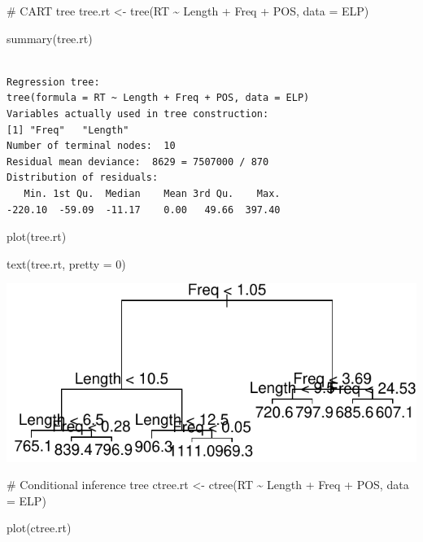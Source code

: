 \documentclass[
  11pt,
  letterpaper,
  DIV=11,
  numbers=noendperiod]{scrreprt}
\newenvironment{Shaded}{\begin{snugshade}}{\end{snugshade}}
\newcommand{\AttributeTok}[1]{\textcolor[rgb]{0.40,0.45,0.13}{#1}}
\newcommand{\CommentTok}[1]{\textcolor[rgb]{0.37,0.37,0.37}{#1}}
\newcommand{\DecValTok}[1]{\textcolor[rgb]{0.68,0.00,0.00}{#1}}
\newcommand{\FunctionTok}[1]{\textcolor[rgb]{0.28,0.35,0.67}{#1}}
\newcommand{\NormalTok}[1]{\textcolor[rgb]{0.00,0.23,0.31}{#1}}
\newcommand{\OtherTok}[1]{\textcolor[rgb]{0.00,0.23,0.31}{#1}}
\newcommand{\SpecialCharTok}[1]{\textcolor[rgb]{0.37,0.37,0.37}{#1}}
\begin{document}
\begin{Shaded}
\begin{Highlighting}[]
\CommentTok{\# CART tree}
\NormalTok{tree.rt }\OtherTok{\textless{}{-}} \FunctionTok{tree}\NormalTok{(RT }\SpecialCharTok{\textasciitilde{}}\NormalTok{ Length }\SpecialCharTok{+}\NormalTok{ Freq }\SpecialCharTok{+}\NormalTok{ POS, }\AttributeTok{data =}\NormalTok{ ELP)}

\FunctionTok{summary}\NormalTok{(tree.rt)}
\end{Highlighting}
\end{Shaded}

\begin{verbatim}

Regression tree:
tree(formula = RT ~ Length + Freq + POS, data = ELP)
Variables actually used in tree construction:
[1] "Freq"   "Length"
Number of terminal nodes:  10 
Residual mean deviance:  8629 = 7507000 / 870 
Distribution of residuals:
   Min. 1st Qu.  Median    Mean 3rd Qu.    Max. 
-220.10  -59.09  -11.17    0.00   49.66  397.40 
\end{verbatim}

\begin{Shaded}
\begin{Highlighting}[]
\FunctionTok{plot}\NormalTok{(tree.rt)}

\FunctionTok{text}\NormalTok{(tree.rt, }\AttributeTok{pretty =} \DecValTok{0}\NormalTok{)}
\end{Highlighting}
\end{Shaded}

\includegraphics{Decision_trees_and_random_forests_files/figure-pdf/unnamed-chunk-6-1.pdf}

\begin{Shaded}
\begin{Highlighting}[]
\CommentTok{\# Conditional inference tree}
\NormalTok{ctree.rt }\OtherTok{\textless{}{-}} \FunctionTok{ctree}\NormalTok{(RT }\SpecialCharTok{\textasciitilde{}}\NormalTok{ Length }\SpecialCharTok{+}\NormalTok{ Freq }\SpecialCharTok{+}\NormalTok{ POS, }\AttributeTok{data =}\NormalTok{ ELP) }

\FunctionTok{plot}\NormalTok{(ctree.rt)}
\end{Highlighting}
\end{Shaded}
\end{document}
